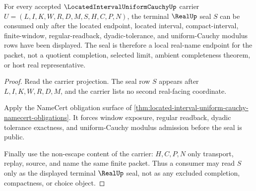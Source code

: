 \begin{theorem}
\label{thm:located-interval-uniform-cauchy-real-seal}
For every accepted $\LocatedIntervalUniformCauchyUp$ carrier $U=(L,I,K,W,R,D,M,S,H,C,P,N)$, the terminal $\RealUp$ seal $S$ can be consumed only after the located endpoint, located interval, compact-interval, finite-window, regular-readback, dyadic-tolerance, and uniform-Cauchy modulus rows have been displayed. The seal is therefore a local real-name endpoint for the packet, not a quotient completion, selected limit, ambient completeness theorem, or host real representative.
\end{theorem}
\begin{proof}
Read the carrier projection. The seal row $S$ appears after $L,I,K,W,R,D,M$, and the carrier lists no second real-facing coordinate.

Apply the NameCert obligation surface of \autoref{thm:located-interval-uniform-cauchy-namecert-obligations}. It forces window exposure, regular readback, dyadic tolerance exactness, and uniform-Cauchy modulus admission before the seal is public.

Finally use the non-escape content of the carrier: $H,C,P,N$ only transport, replay, source, and name the same finite packet. Thus a consumer may read $S$ only as the displayed terminal $\RealUp$ seal, not as any excluded completion, compactness, or choice object.
\end{proof}

